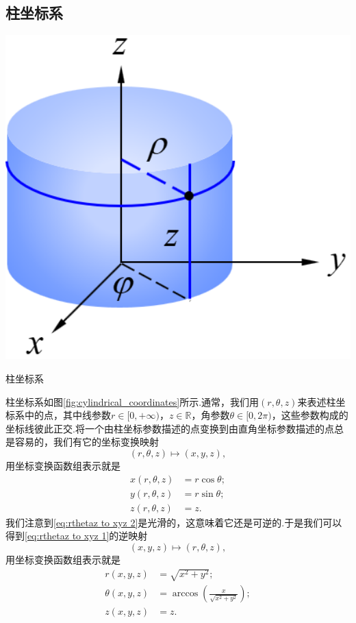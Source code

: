 	\subsection{柱坐标系}
		\begin{marginfigure}
			\centering
			\includegraphics[width=1\textwidth]{figures/cylindrical_coordinates.png}
			\caption{柱坐标系}\label{fig:cylindrical_coordinates}
		\end{marginfigure}
		柱坐标系如图\ref{fig:cylindrical_coordinates}所示.通常，我们用$(r,\theta,z)$来表述柱坐标系中的点，其中线参数$r\in[0,+\infty)$，$z\in \mathbb{R}$，角参数$\theta\in[0,2\pi)$，这些参数构成的坐标线彼此正交.将一个由柱坐标参数描述的点变换到由直角坐标参数描述的点总是容易的，我们有它的坐标变换映射
		\begin{equation}\label{eq:rthetaz to xyz 1}
			(r,\theta,z)\mapsto(x,y,z),
		\end{equation}
		用坐标变换函数组表示就是
		\begin{equation}\label{eq:rthetaz to xyz 2}
			\begin{split}
				x(r,\theta,z)&=r\cos\theta;\\
				y(r,\theta,z)&=r\sin\theta;\\
				z(r,\theta,z)&=z.
			\end{split}
		\end{equation}
		我们注意到\ref{eq:rthetaz to xyz 2}是光滑的，这意味着它还是可逆的.于是我们可以得到\ref{eq:rthetaz to xyz 1}的逆映射
		\begin{equation}\label{eq:xyz to rthetaz 1}
			(x,y,z)\mapsto(r,\theta,z),
		\end{equation}
		用坐标变换函数组表示就是
		\begin{equation}\label{eq:xyz to rthetaz 2}
			\begin{split}
				r(x,y,z)&=\sqrt{x^2+y^2};\\
				\theta(x,y,z)&=\arccos\left(\frac{x}{\sqrt{x^2+y^2}}\right);\\
				z(x,y,z)&=z.
			\end{split}
		\end{equation}
			
